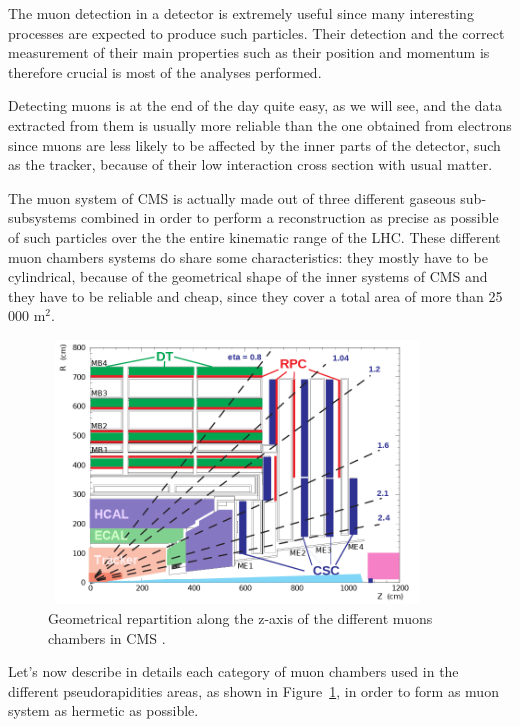 \documentclass[a4paper, 10pt, openright]{report}
\begin{document}
The muon detection in a detector is extremely useful since many interesting processes are expected to produce such particles. Their detection and the correct measurement of their main properties such as their position and momentum is therefore crucial is most of the analyses performed. 

Detecting muons is at the end of the day quite easy, as we will see, and the data extracted from them is usually more reliable than the one obtained from electrons since muons are less likely to be affected by the inner parts of the detector, such as the tracker, because of their low interaction cross section with usual matter.

The muon system of \ac{CMS} is actually made out of three different gaseous sub-subsystems combined in order to perform a reconstruction as precise as possible of such particles over the the entire kinematic range of the \ac{LHC}. These different muon chambers systems do share some characteristics: they mostly have to be cylindrical, because of the geometrical shape of the inner systems of \ac{CMS} and they have to be reliable and cheap, since they cover a total area of more than 25 000 m$^2$.

\begin{figure}[htbp]
\begin{center}
\includegraphics[width=10cm, height=7cm]{figs/CMSMuons.png}
\caption{Geometrical repartition along the z-axis of the different muons chambers in \ac{CMS} \cite{CMSMuons}.}
\label{fig:CMSMuons}
\end{center}
\end{figure}

Let's now describe in details each category of muon chambers used in the different pseudorapidities areas, as shown in Figure~\ref{fig:CMSMuons}, in order to form as muon system as hermetic as possible.
\end{document}
